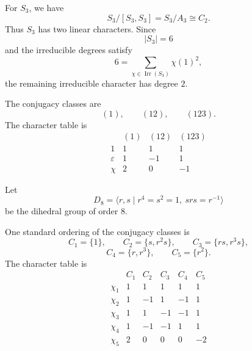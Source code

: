 \begin{example}
For \(S_3\), we have
\[
S_3/[S_3,S_3]=S_3/A_3\cong C_2.
\]
Thus \(S_3\) has two linear characters. Since
\[
|S_3|=6
\]
and the irreducible degrees satisfy
\[
6=\sum_{\chi\in\operatorname{Irr}(S_3)}\chi(1)^2,
\]
the remaining irreducible character has degree \(2\).

The conjugacy classes are
\[
(1),\qquad (12),\qquad (123).
\]
The character table is
\[
\begin{array}{c|ccc}
 & (1) & (12) & (123)\\
\hline
1 & 1 & 1 & 1\\
\varepsilon & 1 & -1 & 1\\
\chi & 2 & 0 & -1
\end{array}
\]
\end{example}

\begin{example}
Let
\[
D_8=\langle r,s\mid r^4=s^2=1,\ srs=r^{-1}\rangle
\]
be the dihedral group of order \(8\).

One standard ordering of the conjugacy classes is
\[
C_1=\{1\},\qquad
C_2=\{s,r^2s\},\qquad
C_3=\{rs,r^3s\},
\]
\[
C_4=\{r,r^3\},\qquad
C_5=\{r^2\}.
\]
The character table is
\[
\begin{array}{c|ccccc}
 & C_1 & C_2 & C_3 & C_4 & C_5\\
\hline
\chi_1 & 1 & 1 & 1 & 1 & 1\\
\chi_2 & 1 & -1 & 1 & -1 & 1\\
\chi_3 & 1 & 1 & -1 & -1 & 1\\
\chi_4 & 1 & -1 & -1 & 1 & 1\\
\chi_5 & 2 & 0 & 0 & 0 & -2
\end{array}
\]
\end{example}

